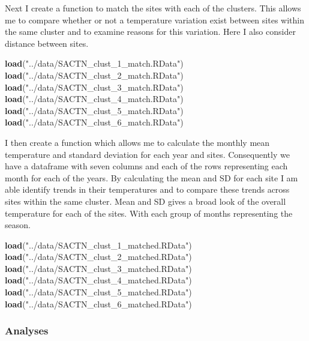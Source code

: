 \documentclass[10pt,A4,]{article}
\newenvironment{Shaded}{\begin{snugshade}}{\end{snugshade}}
\newcommand{\KeywordTok}[1]{\textcolor[rgb]{0.13,0.29,0.53}{\textbf{#1}}}
\newcommand{\StringTok}[1]{\textcolor[rgb]{0.31,0.60,0.02}{#1}}
\newcommand{\NormalTok}[1]{#1}
\begin{document}
Next I create a function to match the sites with each of the clusters.
This allows me to compare whether or not a temperature variation exist
between sites within the same cluster and to examine reasons for this
variation. Here I also consider distance between sites.

\begin{Shaded}
\begin{Highlighting}[]
\KeywordTok{load}\NormalTok{(}\StringTok{"../data/SACTN_clust_1_match.RData"}\NormalTok{)}
\KeywordTok{load}\NormalTok{(}\StringTok{"../data/SACTN_clust_2_match.RData"}\NormalTok{)}
\KeywordTok{load}\NormalTok{(}\StringTok{"../data/SACTN_clust_3_match.RData"}\NormalTok{)}
\KeywordTok{load}\NormalTok{(}\StringTok{"../data/SACTN_clust_4_match.RData"}\NormalTok{)}
\KeywordTok{load}\NormalTok{(}\StringTok{"../data/SACTN_clust_5_match.RData"}\NormalTok{)}
\KeywordTok{load}\NormalTok{(}\StringTok{"../data/SACTN_clust_6_match.RData"}\NormalTok{)}
\end{Highlighting}
\end{Shaded}

I then create a function which allows me to calculate the monthly mean
temperature and standard deviation for each year and sites. Consequently
we have a dataframe with seven columns and each of the rows representing
each month for each of the years. By calculating the mean and SD for
each site I am able identify trends in their temperatures and to compare
these trends across sites within the same cluster. Mean and SD gives a
broad look of the overall temperature for each of the sites. With each
group of months representing the season.

\begin{Shaded}
\begin{Highlighting}[]
\KeywordTok{load}\NormalTok{(}\StringTok{"../data/SACTN_clust_1_matched.RData"}\NormalTok{)}
\KeywordTok{load}\NormalTok{(}\StringTok{"../data/SACTN_clust_2_matched.RData"}\NormalTok{)}
\KeywordTok{load}\NormalTok{(}\StringTok{"../data/SACTN_clust_3_matched.RData"}\NormalTok{)}
\KeywordTok{load}\NormalTok{(}\StringTok{"../data/SACTN_clust_4_matched.RData"}\NormalTok{)}
\KeywordTok{load}\NormalTok{(}\StringTok{"../data/SACTN_clust_5_matched.RData"}\NormalTok{)}
\KeywordTok{load}\NormalTok{(}\StringTok{"../data/SACTN_clust_6_matched.RData"}\NormalTok{)}
\end{Highlighting}
\end{Shaded}

\subsubsection*{Analyses}
\end{document}
